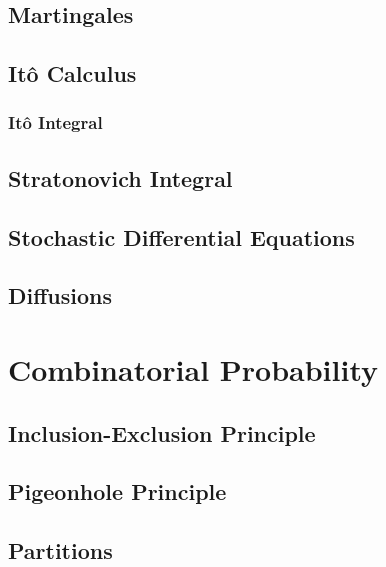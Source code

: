 \documentclass[11pt]{report} %
\begin{document}
\section{Martingales}

\section{It\^{o} Calculus}

\subsection{It\^{o} Integral}

\section{Stratonovich Integral}

\section{Stochastic Differential Equations}

\section{Diffusions}

\chapter{Combinatorial Probability}

\section{Inclusion-Exclusion Principle}

\section{Pigeonhole Principle}

\section{Partitions}
\end{document}
